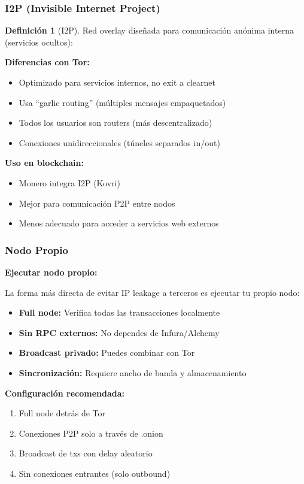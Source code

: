 \documentclass[11pt,a4paper,twoside]{book}
\theoremstyle{definition}
\newtheorem{definition}{Definición}[chapter]
\theoremstyle{remark}
\begin{document}
\subsubsection{I2P (Invisible Internet Project)}

\begin{definition}[I2P]
Red overlay diseñada para comunicación anónima interna (servicios ocultos):

\textbf{Diferencias con Tor:}
\begin{itemize}
    \item Optimizado para servicios internos, no exit a clearnet
    \item Usa ``garlic routing'' (múltiples mensajes empaquetados)
    \item Todos los usuarios son routers (más descentralizado)
    \item Conexiones unidireccionales (túneles separados in/out)
\end{itemize}

\textbf{Uso en blockchain:}
\begin{itemize}
    \item Monero integra I2P (Kovri)
    \item Mejor para comunicación P2P entre nodos
    \item Menos adecuado para acceder a servicios web externos
\end{itemize}
\end{definition}

\subsubsection{Nodo Propio}

\begin{keyidea}
\textbf{Ejecutar nodo propio:}

La forma más directa de evitar IP leakage a terceros es ejecutar tu propio nodo:

\begin{itemize}
    \item \textbf{Full node:} Verifica todas las transacciones localmente
    \item \textbf{Sin RPC externos:} No dependes de Infura/Alchemy
    \item \textbf{Broadcast privado:} Puedes combinar con Tor
    \item \textbf{Sincronización:} Requiere ancho de banda y almacenamiento
\end{itemize}

\textbf{Configuración recomendada:}
\begin{enumerate}
    \item Full node detrás de Tor
    \item Conexiones P2P solo a través de .onion
    \item Broadcast de txs con delay aleatorio
    \item Sin conexiones entrantes (solo outbound)
\end{enumerate}
\end{keyidea}
\end{document}
